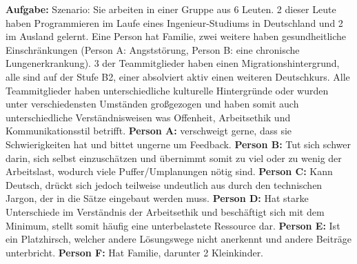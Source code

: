 \documentclass[a4paper]{article}
\begin{document}
\begin{flushleft}


\newpage


\textbf{Aufgabe:}\newline \newline
Szenario: Sie arbeiten in einer Gruppe aus 6 Leuten. 2 dieser Leute haben Programmieren im Laufe eines Ingenieur-Studiums in Deutschland und 2 im Ausland gelernt. Eine Person hat Familie, zwei weitere haben gesundheitliche Einschränkungen (Person A: Angststörung, Person B: eine chronische Lungenerkrankung). 3 der Teammitglieder haben einen Migrationshintergrund, alle sind auf der Stufe B2, einer absolviert aktiv einen weiteren Deutschkurs. Alle Teammitglieder haben unterschiedliche kulturelle Hintergründe oder wurden unter verschiedensten Umständen großgezogen und haben somit auch unterschiedliche Verständnisweisen was Offenheit, Arbeitsethik und Kommunikationsstil betrifft. \newline \newline \textbf{Person A:} verschweigt gerne, dass sie Schwierigkeiten hat und bittet ungerne um Feedback. \newline \textbf{Person B:} Tut sich schwer darin, sich selbst einzuschätzen und übernimmt somit zu viel oder zu wenig der Arbeitslast, wodurch viele Puffer/Umplanungen nötig sind. \newline \textbf{Person C:} Kann Deutsch, drückt sich jedoch teilweise undeutlich aus durch den technischen Jargon, der in die Sätze eingebaut werden muss. \newline \textbf{Person D:} Hat starke Unterschiede im Verständnis der Arbeitsethik und beschäftigt sich mit dem Minimum, stellt somit häufig eine unterbelastete Ressource dar. \newline \textbf{Person E:} Ist ein Platzhirsch, welcher andere Lösungswege nicht anerkennt und andere Beiträge unterbricht. \newline \textbf{Person F:} Hat Familie, darunter 2 Kleinkinder.\newline \newline


\end{flushleft}
\end{document}
